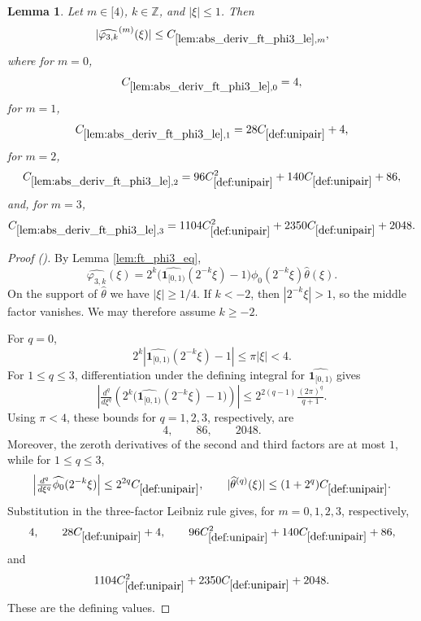 \documentclass[12pt,reqno]{amsart}
\newcommand{\auto}{{({\tiny\faCar})}}
\theoremstyle{plain}
\newtheorem{lemma}[theorem]{Lemma}
\numberwithin{equation}{section}
\theoremstyle{remark}
\newcommand{\uses}[1]{}
\newcommand{\usesdefs}[1]{}
\newcommand{\Z}{{\mathbb Z}}
\begin{document}
\begin{lemma}\label{lem:abs_deriv_ft_phi3_le}\uses{lem:ft_phi3_eq}\usesdefs{def:cn-window,def:unipair,defn:window based bump functions}
Let $m\in[4)$, $k\in\Z$, and $|\xi|\le1$. Then
\begin{equation}\label{auto:varphi-three-Fourier-derivative-bound}
|\widehat{\varphi_{3,k}}^{(m)}(\xi)|
\le C_{\ref{lem:abs_deriv_ft_phi3_le},m},
\end{equation}
where for $m=0$,
\begin{equation}\label{auto:varphi-three-Fourier-derivative-constant}
C_{\ref{lem:abs_deriv_ft_phi3_le},0}=4,
\end{equation}
for $m=1$,
\begin{equation}\label{auto:varphi-three-Fourier-derivative-constant-one}
C_{\ref{lem:abs_deriv_ft_phi3_le},1}=28C_{\ref{def:unipair}}+4,
\end{equation}
for $m=2$,
\begin{equation}\label{auto:varphi-three-Fourier-derivative-constant-two}
C_{\ref{lem:abs_deriv_ft_phi3_le},2}=96C_{\ref{def:unipair}}^2+140C_{\ref{def:unipair}}+86,
\end{equation}
and, for $m=3$,
\begin{equation}\label{auto:varphi-three-Fourier-derivative-constant-three}
C_{\ref{lem:abs_deriv_ft_phi3_le},3}=1104C_{\ref{def:unipair}}^2+2350C_{\ref{def:unipair}}+2048.
\end{equation}
\end{lemma}
\begin{proof}[Proof \auto]
By Lemma \ref{lem:ft_phi3_eq},
\[
\widehat{\varphi_{3,k}}(\xi)
=
2^k\bigl(\widehat{\mathbf1_{[0,1)}}(2^{-k}\xi)-1\bigr)
\widehat{\phi_0}(2^{-k}\xi)\widehat\theta(\xi).
\]
On the support of $\widehat\theta$ we have $|\xi|\ge1/4$. If $k<-2$, then $|2^{-k}\xi|>1$, so the middle factor vanishes. We may therefore assume $k\ge-2$.

For $q=0$,
\[
2^k|\widehat{\mathbf1_{[0,1)}}(2^{-k}\xi)-1|
\le\pi|\xi|<4.
\]
For $1\le q\le3$, differentiation under the defining integral for $\widehat{\mathbf1_{[0,1)}}$ gives
\[
\left|\tfrac{d^q}{d\xi^q}
\left(2^k\bigl(\widehat{\mathbf1_{[0,1)}}(2^{-k}\xi)-1\bigr)\right)\right|
\le2^{2(q-1)}\tfrac{(2\pi)^q}{q+1}.
\]
Using $\pi<4$, these bounds for $q=1,2,3$, respectively, are
\[
4,
\qquad
86,
\qquad
2048.
\]
Moreover, the zeroth derivatives of the second and third factors are at most $1$, while for $1\le q\le3$,
\[
\left|\tfrac{d^q}{d\xi^q}\widehat{\phi_0}(2^{-k}\xi)\right|
\le2^{2q}C_{\ref{def:unipair}},
\qquad
|\widehat\theta^{(q)}(\xi)|\le(1+2^q)C_{\ref{def:unipair}}.
\]
Substitution in the three-factor Leibniz rule gives, for $m=0,1,2,3$, respectively,
\[
4,
\qquad
28C_{\ref{def:unipair}}+4,
\qquad
96C_{\ref{def:unipair}}^2+140C_{\ref{def:unipair}}+86,
\]
and
\[
1104C_{\ref{def:unipair}}^2+2350C_{\ref{def:unipair}}+2048.
\]
These are the defining values.
\end{proof}
\end{document}
